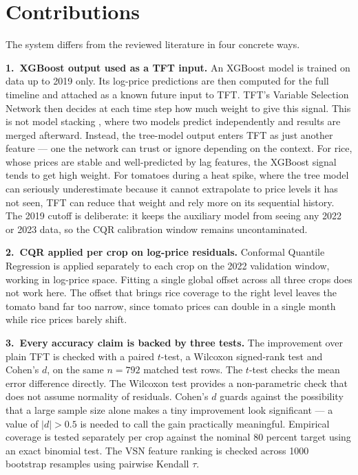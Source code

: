 \documentclass[conference,twoside]{IEEEtran}
\begin{document}
\section{Contributions}
\label{sec:contributions}

The system differs from the reviewed literature in four concrete ways.

\textbf{1.\ XGBoost output used as a TFT input.} An XGBoost model is trained on data up to 2019 only. Its log-price predictions are then computed for the full timeline and attached as a known future input to TFT. TFT's Variable Selection Network then decides at each time step how much weight to give this signal. This is not model stacking \cite{wolpert1992stacking}, where two models predict independently and results are merged afterward. Instead, the tree-model output enters TFT as just another feature — one the network can trust or ignore depending on the context. For rice, whose prices are stable and well-predicted by lag features, the XGBoost signal tends to get high weight. For tomatoes during a heat spike, where the tree model can seriously underestimate because it cannot extrapolate to price levels it has not seen, TFT can reduce that weight and rely more on its sequential history. The 2019 cutoff is deliberate: it keeps the auxiliary model from seeing any 2022 or 2023 data, so the CQR calibration window remains uncontaminated.

\textbf{2.\ CQR applied per crop on log-price residuals.} Conformal Quantile Regression \cite{romano2019cqr} is applied separately to each crop on the 2022 validation window, working in log-price space. Fitting a single global offset across all three crops does not work here. The offset that brings rice coverage to the right level leaves the tomato band far too narrow, since tomato prices can double in a single month while rice prices barely shift.

\textbf{3.\ Every accuracy claim is backed by three tests.} The improvement over plain TFT is checked with a paired $t$-test, a Wilcoxon signed-rank test and Cohen's $d$, on the same $n = 792$ matched test rows. The $t$-test checks the mean error difference directly. The Wilcoxon test provides a non-parametric check that does not assume normality of residuals. Cohen's $d$ guards against the possibility that a large sample size alone makes a tiny improvement look significant — a value of $|d| > 0.5$ is needed to call the gain practically meaningful. Empirical coverage is tested separately per crop against the nominal 80 percent target using an exact binomial test. The VSN feature ranking is checked across 1000 bootstrap resamples using pairwise Kendall $\tau$.
\end{document}
